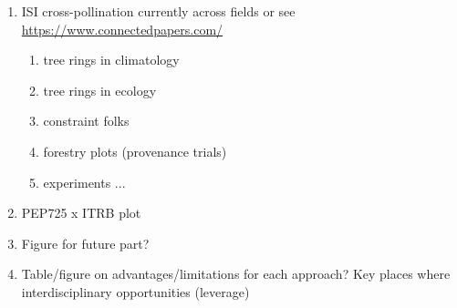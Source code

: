 \documentclass[11pt,letter]{article}
\begin{document}
\begin{enumerate}
\begin{enumerate}
\begin{enumerate}
\end{enumerate}
\end{enumerate}
\item ISI cross-pollination currently across fields or see \url{https://www.connectedpapers.com/}
\begin{enumerate}
\item tree rings in climatology
\item tree rings in ecology
\item constraint folks
\item forestry plots (provenance trials)
\item experiments ... 
\end{enumerate}
\item PEP725 x ITRB plot
\item Figure for future part?
\item Table/figure on advantages/limitations for each approach? Key places where interdisciplinary opportunities (leverage)
\end{enumerate}
\end{document}
